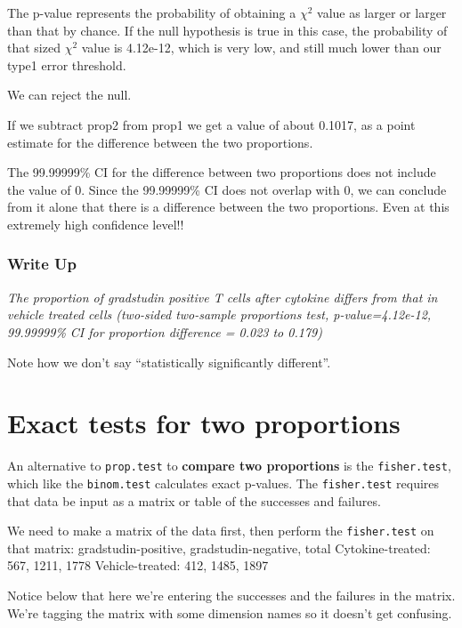\documentclass[]{book}
\begin{document}
The p-value represents the probability of obtaining a \(\chi^2\) value as larger or larger than that by chance. If the null hypothesis is true in this case, the probability of that sized \(\chi^2\) value is 4.12e-12, which is very low, and still much lower than our type1 error threshold.

We can reject the null.

If we subtract prop2 from prop1 we get a value of about 0.1017, as a point estimate for the difference between the two proportions.

The 99.99999\% CI for the difference between two proportions does not include the value of 0. Since the 99.99999\% CI does not overlap with 0, we can conclude from it alone that there is a difference between the two proportions. Even at this extremely high confidence level!!

\hypertarget{write-up}{%
\subsubsection{Write Up}\label{write-up}}

\emph{The proportion of gradstudin positive T cells after cytokine differs from that in vehicle treated cells (two-sided two-sample proportions test, p-value=4.12e-12, 99.99999\% CI for proportion difference = 0.023 to 0.179)}

Note how we don't say ``statistically significantly different''.

\hypertarget{exact-tests-for-two-proportions}{%
\section{Exact tests for two proportions}\label{exact-tests-for-two-proportions}}

An alternative to \texttt{prop.test} to \textbf{compare two proportions} is the \texttt{fisher.test}, which like the \texttt{binom.test} calculates exact p-values. The \texttt{fisher.test} requires that data be input as a matrix or table of the successes and failures.

We need to make a matrix of the data first, then perform the \texttt{fisher.test} on that matrix:
gradstudin-positive, gradstudin-negative, total
Cytokine-treated: 567, 1211, 1778
Vehicle-treated: 412, 1485, 1897

Notice below that here we're entering the successes and the failures in the matrix. We're tagging the matrix with some dimension names so it doesn't get confusing.
\end{document}
